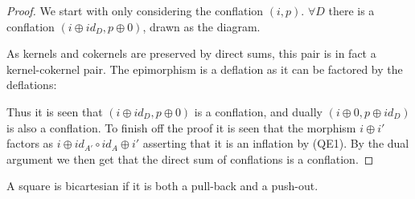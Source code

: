     \begin{proof}
        We start with only considering the conflation $(i,p)$. $\forall{D}$ there is a conflation $(i\oplus id_D, p\oplus 0)$, drawn as the diagram.
        \begin{center}
        \end{center}
        As kernels and cokernels are preserved by direct sums, this pair is in fact a kernel-cokernel pair. The epimorphism is a deflation as it can be factored by the deflations:
        \begin{center}
        \end{center}
        Thus it is seen that $(i\oplus id_D, p\oplus 0)$ is a conflation, and dually $(i\oplus 0, p\oplus id_D)$ is also a conflation. To finish off the proof it is seen that the morphism $i\oplus i'$ factors as $i\oplus id_{A'}\circ id_A\oplus i'$ asserting that it is an inflation by (QE1). By the dual argument we then get that the direct sum of conflations is a conflation.
    \end{proof}

    \begin{definition}
        A square is bicartesian if it is both a pull-back and a push-out.
    \end{definition}

